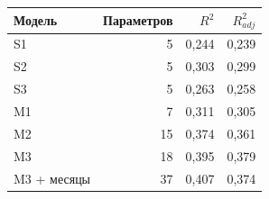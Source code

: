 \begin{tabular}{lrrr}
\toprule
Модель & Параметров & $R^2$ & $R^2_{adj}$ \\
\midrule
S1 & 5 & 0,244 & 0,239 \\
S2 & 5 & 0,303 & 0,299 \\
S3 & 5 & 0,263 & 0,258 \\
M1 & 7 & 0,311 & 0,305 \\
M2 & 15 & 0,374 & 0,361 \\
M3 & 18 & 0,395 & 0,379 \\
M3 + месяцы & 37 & 0,407 & 0,374 \\
\bottomrule
\end{tabular}
